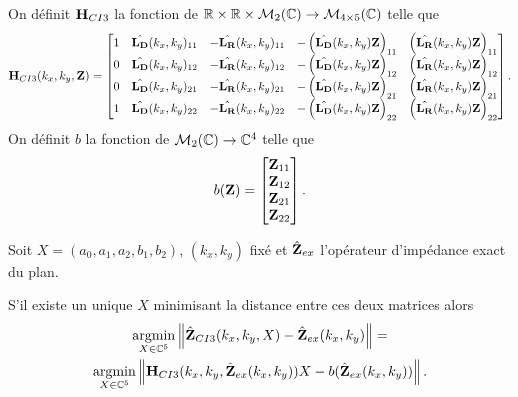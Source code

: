     \begin{defn}
      On définit \(\mathbf{H}_{CI3}\) la fonction de \(\mathbb R \times \mathbb R \times \mathcal{M}_2(\mathbb C) \rightarrow \mathcal{M}_{4\times5}(\mathbb C)\) telle que
      \begin{equation*}
        \mathbf{H}_{CI3}(k_x,k_y,\mathbf{Z}) = \begin{bmatrix}
        1 & \hat{\mathbf{L_D}}(k_x,k_y)_{11} & -\hat{\mathbf{L_R}}(k_x,k_y)_{11} & -\left(\hat{\mathbf{L_D}}(k_x,k_y)\mathbf{Z}\right)_{11} & \left(\hat{\mathbf{L_R}}(k_x,k_y)\mathbf{Z}\right)_{11}
        \\
        0 & \hat{\mathbf{L_D}}(k_x,k_y)_{12} & -\hat{\mathbf{L_R}}(k_x,k_y)_{12} & -\left(\hat{\mathbf{L_D}}(k_x,k_y)\mathbf{Z}\right)_{12} & \left(\hat{\mathbf{L_R}}(k_x,k_y)\mathbf{Z}\right)_{12}
        \\
        0 & \hat{\mathbf{L_D}}(k_x,k_y)_{21} & -\hat{\mathbf{L_R}}(k_x,k_y)_{21} & -\left(\hat{\mathbf{L_D}}(k_x,k_y)\mathbf{Z}\right)_{21} & \left(\hat{\mathbf{L_R}}(k_x,k_y)\mathbf{Z}\right)_{21}
        \\
        1 & \hat{\mathbf{L_D}}(k_x,k_y)_{22} & -\hat{\mathbf{L_R}}(k_x,k_y)_{22} & -\left(\hat{\mathbf{L_D}}(k_x,k_y)\mathbf{Z}\right)_{22} & \left(\hat{\mathbf{L_R}}(k_x,k_y)\mathbf{Z}\right)_{22}
        \end{bmatrix}.
      \end{equation*}
      On définit \(b\) la fonction de \(\mathcal{M}_2(\mathbb C) \rightarrow \mathbb C^4\) telle que
      \begin{equation*}
        b(\mathbf{Z}) = \begin{bmatrix}
        \mathbf{Z}_{11}
        \\
        \mathbf{Z}_{12}
        \\
        \mathbf{Z}_{21}
        \\
        \mathbf{Z}_{22}
        \end{bmatrix}.
      \end{equation*}
    \end{defn}

    \begin{prop}
      Soit \(X = (a_0,a_1,a_2,b_1,b_2)\), \((k_x,k_y)\) fixé et \(\hat{\mathbf{Z}}_{ex}\) l'opérateur d'impédance exact du plan.

      S'il existe un unique \(X\) minimisant la distance entre ces deux matrices alors
      \begin{multline*}
        {\underset{X\in\mathbb C^5}{\operatorname{argmin}}} \left\lVert\hat{\mathbf{Z}}_{CI3}(k_x,k_y,X) - \hat{\mathbf{Z}}_{ex}(k_x,k_y)\right\rVert =
        \\
        {\underset{X\in\mathbb C^5}{\operatorname{argmin}}} \left\lVert\mathbf{H}_{CI3}(k_x,k_y,\hat{\mathbf{Z}}_{ex}(k_x,k_y))X - b(\hat{\mathbf{Z}}_{ex}(k_x,k_y))\right\rVert.
      \end{multline*}
    \end{prop}

